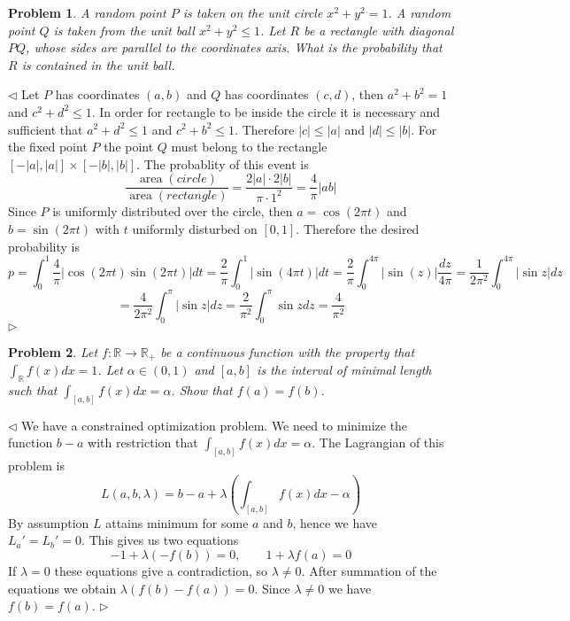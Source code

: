 \documentclass[12pt]{article}
\newtheorem{problem}{Problem}[subsection]
\newenvironment{solution}{\par $\triangleleft$}{$\triangleright$}
\begin{document}
\begin{problem} A random point $P$ is taken on the unit circle $x^2+y^2=1$. A
random point $Q$ is taken from the unit ball $x^2+y^2\leq 1$. Let $R$ be a
rectangle with diagonal $PQ$, whose sides are parallel to the coordinates axis.
What is the probability that $R$ is contained in the unit ball.
\end{problem}
\begin{solution} Let $P$ has coordinates $(a,b)$ and $Q$ has coordinates
    $(c,d)$, then $a^2+b^2=1$ and $c^2+d^2\leq 1$. In order for rectangle to be
    inside the circle it is necessary and sufficient that $a^2+d^2\leq 1$ and
    $c^2+b^2\leq 1$. Therefore $|c|\leq|a|$ and $|d|\leq |b|$. For the fixed
    point $P$ the point $Q$ must belong to the rectangle
    $[-|a|,|a|]\times[-|b|,|b|]$. The probablity of this event is
    $$
        \frac{\operatorname{area}(circle)}{\operatorname{area}(rectangle)}
        =\frac{2|a|\cdot2|b|}{\pi \cdot 1^2}=\frac{4}{\pi}|ab|
    $$
    Since $P$ is uniformly distributed over the circle, then $a=\cos(2\pi t)$
    and $b=\sin(2\pi t)$ with $t$ uniformly disturbed on $[0,1]$. Therefore the
    desired probability is
    $$
        p
        =\int_{0}^{1} \frac{4}{\pi}|\cos(2\pi t)\sin(2\pi t)|dt
        =\frac{2}{\pi}\int_{0}^{1} |\sin(4\pi t)|dt
        =\frac{2}{\pi}\int_{0}^{4\pi} |\sin(z)|\frac{dz}{4\pi}
        =\frac{1}{2\pi^2}\int_0^{4\pi}|\sin z|dz
    $$
    $$
        =\frac{4}{2\pi^2}\int_0^{\pi}|\sin z|dz
        =\frac{2}{\pi^2}\int_0^\pi \sin z dz
        =\frac{4}{\pi^2}
    $$
\end{solution}

\begin{problem} Let $f:\mathbb{R}\to\mathbb{R}_+$ be a continuous function with
the property that $\int_{\mathbb{R}} f(x)dx=1$. Let $\alpha\in(0,1)$ and $[a,b]$
is  the interval of minimal length such that $\int_{[a,b]} f(x)dx=\alpha$. Show
that $f(a)=f(b)$.
\end{problem}
\begin{solution} We have a constrained optimization problem. We need to minimize
    the function $b-a$ with restriction that $\int_{[a,b]}f(x)dx=\alpha$. The
    Lagrangian of this problem is
    $$
        L(a,b,\lambda)=b-a+\lambda\left(\int_{[a,b]}f(x)dx-\alpha\right)
    $$
    By assumption $L$ attains minimum for some $a$ and $b$, hence we have
    $L_a'=L_b'=0$. This gives us two equations
    $$
        -1+\lambda(-f(b))=0,\qquad 1+\lambda f(a)=0
    $$
    If $\lambda=0$ these equations give a contradiction, so $\lambda\neq 0$.
    After summation of the equations we obtain $\lambda(f(b)-f(a))=0$. Since
    $\lambda\neq 0$ we have $f(b)=f(a)$.
\end{solution}
\end{document}
